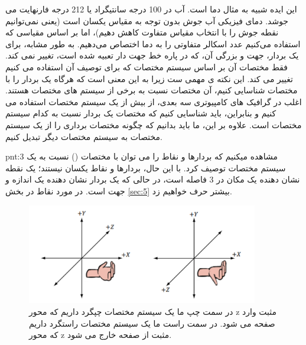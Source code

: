 {\begin{spacing}{1.5}
        این ایده شبیه به مثال دما است. آب در 100 درجه سانتیگراد یا 212 درجه فارنهایت می جوشد.
        دمای فیزیکی آب جوش بدون توجه به مقیاس یکسان است (یعنی نمی‌توانیم نقطه جوش را با انتخاب مقیاس متفاوت کاهش دهیم)،
        اما بر اساس مقیاسی که استفاده می‌کنیم عدد اسکالر متفاوتی را به دما اختصاص می‌دهیم.
        به طور مشابه، برای یک بردار، جهت و بزرگی آن، که در پاره خط جهت دار تعبیه شده است، تغییر نمی کند.
        فقط مختصات آن بر اساس سیستم مختصات که برای توصیف آن استفاده می کنیم تغییر می کند.
        این نکته ی مهمی ست زیرا به این معنی است که هرگاه یک بردار را با مختصات شناسایی کنیم، آن مختصات نسبت به برخی از سیستم های مختصات هستند.
        اغلب در گرافیک های کامپیوتری سه بعدی، از بیش از یک سیستم مختصات استفاده می کنیم و بنابراین، باید شناسایی کنیم که مختصات یک بردار نسبت به کدام سیستم مختصات است.
        علاوه بر این، ما باید بدانیم که چگونه مختصات برداری را از یک سیستم مختصات به سیستم مختصات دیگر تبدیل کنیم.
        \textbf{\vspace{-10pt}}
        \begin{point}{pnt:3}
            \Large
            مشاهده میکنیم که بردارها و نقاط را می توان با مختصات () نسبت به یک سیستم مختصات توصیف کرد.
            با این حال، بردارها و نقاط یکسان نیستند؛ یک نقطه نشان دهنده یک مکان در 3 فاصله است، در حالی که یک بردار نشان دهنده یک اندازه و جهت است.
            در مورد نقاط در بخش \ref{sec:5} بیشتر حرف خواهیم زد.
        \end{point}
        \textbf{\vspace{-50pt}}
    \end{spacing}

    \begin{figure}[H]
        \centering
        \setlength{\belowcaptionskip}{-10pt}
        \includegraphics[width=0.9\textwidth]{Images/4/4.Session.1.1.5}
        \caption{در سمت چپ ما یک سیستم مختصات چپگرد داریم که محور z مثبت وارد صفحه می شود. در سمت راست ما یک سیستم مختصات راستگرد داریم که محور z مثبت از صفحه خارج می شود.}
        \label{fig:4.Session.1.1.5}
    \end{figure}
}

